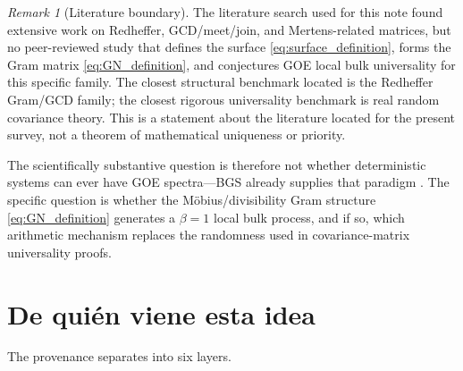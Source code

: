 \documentclass[11pt]{amsart}
\numberwithin{equation}{section}
\theoremstyle{plain}
\theoremstyle{definition}
\theoremstyle{remark}
\newtheorem{remark}[theorem]{Remark}
\begin{document}
\begin{remark}[Literature boundary]
\label{rem:literature_boundary}
The literature search used for this note found extensive work on Redheffer, GCD/meet/join, and Mertens-related matrices, but no peer-reviewed study that defines the surface \eqref{eq:surface_definition}, forms the Gram matrix \eqref{eq:GN_definition}, and conjectures GOE local bulk universality for this specific family.  The closest structural benchmark located is the Redheffer Gram/GCD family; the closest rigorous universality benchmark is real random covariance theory.  This is a statement about the literature located for the present survey, not a theorem of mathematical uniqueness or priority.
\end{remark}

The scientifically substantive question is therefore not whether deterministic systems can ever have GOE spectra---BGS already supplies that paradigm \cite{BGS1984}.  The specific question is whether the M\"obius/divisibility Gram structure \eqref{eq:GN_definition} generates a $\beta=1$ local bulk process, and if so, which arithmetic mechanism replaces the randomness used in covariance-matrix universality proofs.

\section{De qui\'en viene esta idea}
\label{sec:provenance}

The provenance separates into six layers.
\end{document}
